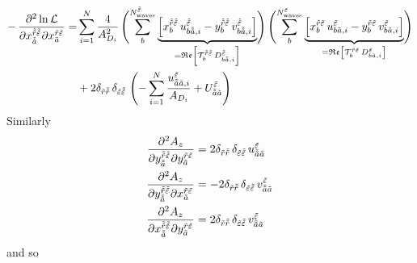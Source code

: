 \begin{align}
  \label{eq:likelihood_function_re_re_deriv}
  \begin{split}
  -\dmd{\ln \mathcal{L}}{2}{{x_{\doubletilde{a}}^{\doubletilde{r} \doubletilde{\refl}}}}{}{{x_{\tilde{a}}^{\tilde{r} \tilde{\refl}}}}{}
  = &\sum_{i = 1}^{N} \frac{4}{A_{D_i}^2}
  \rBrk[4]{\sum_b^{N^{\doubletilde{\refl}}_\text{waves}}
  \underbrace{\sBrk{x_b^{\doubletilde{r} \doubletilde{\refl}}\, u^{\doubletilde{\refl}}_{b \doubletilde{a}, i}
    - y_b^{\doubletilde{r} \doubletilde{\refl}}\, v^{\doubletilde{\refl}}_{b \doubletilde{a}, i}}}_{%
     = \Re\sBrk{\mathcal{T}_b^{\doubletilde{r} \doubletilde{\refl}}\, D^{\doubletilde{\refl}}_{b \doubletilde{a}, i}}}}
  \rBrk[4]{\sum_b^{N^{\tilde{\refl}}_\text{waves}}
  \underbrace{\sBrk{x_b^{\tilde{r} \tilde{\refl}}\, u^{\tilde{\refl}}_{b \tilde{a}, i}
    - y_b^{\tilde{r} \tilde{\refl}}\, v^{\tilde{\refl}}_{b \tilde{a}, i}}}_{%
    = \Re\sBrk{\mathcal{T}_b^{\tilde{r} \tilde{\refl}}\, D^{\tilde{\refl}}_{b \tilde{a}, i}}}} \\
  &+ 2 \delta_{\tilde{r} \doubletilde{r}}\, \delta_{\tilde{\refl} \doubletilde{\refl}}\,
  \rBrk[4]{-\sum_{i = 1}^{N} \frac{u^{\tilde{\refl}}_{\doubletilde{a} \tilde{a}, i}}{A_{D_i}} + U^{\tilde{\refl}}_{\doubletilde{a} \tilde{a}}}
  \end{split}
\end{align}
Similarly
\begin{align}
  \label{eq:likelihood_function_sum_term_im_im_deriv}
  \dmd{A_z}{2}{{y_{\doubletilde{a}}^{\doubletilde{r} \doubletilde{\refl}}}}{}{{y_{\tilde{a}}^{\tilde{r} \tilde{\refl}}}}{}
  &= 2 \delta_{\tilde{r} \doubletilde{r}}\, \delta_{\tilde{\refl} \doubletilde{\refl}}\, u^{\tilde{\refl}}_{\doubletilde{a} \tilde{a}} \\
  \label{eq:likelihood_function_sum_term_re_im_deriv}
  \dmd{A_z}{2}{{y_{\doubletilde{a}}^{\doubletilde{r} \doubletilde{\refl}}}}{}{{x_{\tilde{a}}^{\tilde{r} \tilde{\refl}}}}{}
  &= -2 \delta_{\tilde{r} \doubletilde{r}}\, \delta_{\tilde{\refl} \doubletilde{\refl}}\, v^{\tilde{\refl}}_{\doubletilde{a} \tilde{a}} \\
  \label{eq:likelihood_function_sum_term_im_re_deriv}
  \dmd{A_z}{2}{{x_{\doubletilde{a}}^{\doubletilde{r} \doubletilde{\refl}}}}{}{{y_{\tilde{a}}^{\tilde{r} \tilde{\refl}}}}{}
  &= 2 \delta_{\tilde{r} \doubletilde{r}}\, \delta_{\tilde{\refl} \doubletilde{\refl}}\, v^{\tilde{\refl}}_{\doubletilde{a} \tilde{a}}
\end{align}
and so
